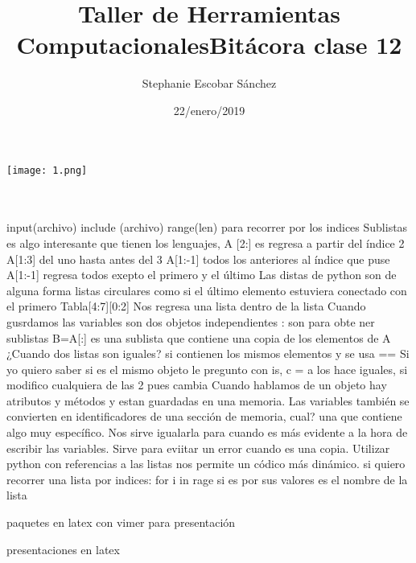 \documentclass{article}
\title{\Huge Taller de Herramientas Computacionales}
\author{Stephanie Escobar Sánchez}
\date{22/enero/2019}
\begin{document}
	\maketitle
	\begin{center}
		\texttt{[image: 1.png]}	
	\end{center}
	\newpage
	\title{\Huge Bitácora clase 12} \\
	\\
	
	input(archivo)
	include (archivo)
	range(len) para recorrer por los indices 
	Sublistas es algo interesante que tienen los lenguajes, A [2:] es regresa a partir del índice 2 
	A[1:3] del uno hasta antes del 3 
	A[1:-1] todos los anteriores al índice que puse
	A[1:-1] regresa todos exepto el primero y el último 
	Las distas de python son de alguna forma listas circulares como si el último elemento estuviera conectado con el primero 
	Tabla[4:7][0:2] Nos regresa una lista dentro de la lista
	Cuando gusrdamos las variables son dos objetos independientes 
	: son para obte 
	ner sublistas B=A[:] es una sublista que contiene una copia de los elementos de A
	¿Cuando dos listas son iguales?
	si contienen los mismos elementos y se usa ==
	Si yo quiero saber si es el mismo objeto le pregunto con is,
	c = a los hace iguales, si modifico cualquiera de las 2 pues cambia 
	Cuando hablamos de un objeto hay atributos y métodos y estan guardadas en una memoria.
	Las variables también se convierten en identificadores de una sección de memoria, cual? una que contiene algo muy específico. Nos sirve igualarla para cuando es más evidente a la hora de escribir las variables.  Sirve para eviitar un error cuando es una copia. Utilizar python con referencias a las listas nos permite un códico más dinámico.
	si quiero recorrer una lista por indices:
	for i in rage
	si es por sus valores es el nombre de la lista
	
	paquetes en latex con vimer para presentación
	
presentaciones en latex
	
\end{document}
